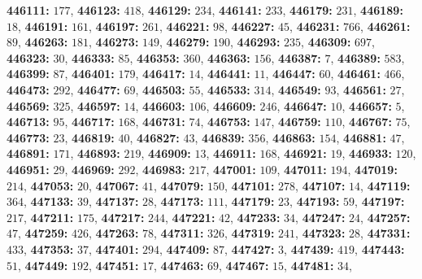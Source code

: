 \textsf{\bfseries 446111:} $177$, \textsf{\bfseries 446123:} $418$, \textsf{\bfseries 446129:} $234$, \textsf{\bfseries 446141:} $233$, \textsf{\bfseries 446179:} $231$, \textsf{\bfseries 446189:} $18$, \textsf{\bfseries 446191:} $161$, \textsf{\bfseries 446197:} $261$, \textsf{\bfseries 446221:} $98$, \textsf{\bfseries 446227:} $45$, \textsf{\bfseries 446231:} $766$, \textsf{\bfseries 446261:} $89$, \textsf{\bfseries 446263:} $181$, \textsf{\bfseries 446273:} $149$, \textsf{\bfseries 446279:} $190$, \textsf{\bfseries 446293:} $235$, \textsf{\bfseries 446309:} $697$, \textsf{\bfseries 446323:} $30$, \textsf{\bfseries 446333:} $85$, \textsf{\bfseries 446353:} $360$, \textsf{\bfseries 446363:} $156$, \textsf{\bfseries 446387:} $7$, \textsf{\bfseries 446389:} $583$, \textsf{\bfseries 446399:} $87$, \textsf{\bfseries 446401:} $179$, \textsf{\bfseries 446417:} $14$, \textsf{\bfseries 446441:} $11$, \textsf{\bfseries 446447:} $60$, \textsf{\bfseries 446461:} $466$, \textsf{\bfseries 446473:} $292$, \textsf{\bfseries 446477:} $69$, \textsf{\bfseries 446503:} $55$, \textsf{\bfseries 446533:} $314$, \textsf{\bfseries 446549:} $93$, \textsf{\bfseries 446561:} $27$, \textsf{\bfseries 446569:} $325$, \textsf{\bfseries 446597:} $14$, \textsf{\bfseries 446603:} $106$, \textsf{\bfseries 446609:} $246$, \textsf{\bfseries 446647:} $10$, \textsf{\bfseries 446657:} $5$, \textsf{\bfseries 446713:} $95$, \textsf{\bfseries 446717:} $168$, \textsf{\bfseries 446731:} $74$, \textsf{\bfseries 446753:} $147$, \textsf{\bfseries 446759:} $110$, \textsf{\bfseries 446767:} $75$, \textsf{\bfseries 446773:} $23$, \textsf{\bfseries 446819:} $40$, \textsf{\bfseries 446827:} $43$, \textsf{\bfseries 446839:} $356$, \textsf{\bfseries 446863:} $154$, \textsf{\bfseries 446881:} $47$, \textsf{\bfseries 446891:} $171$, \textsf{\bfseries 446893:} $219$, \textsf{\bfseries 446909:} $13$, \textsf{\bfseries 446911:} $168$, \textsf{\bfseries 446921:} $19$, \textsf{\bfseries 446933:} $120$, \textsf{\bfseries 446951:} $29$, \textsf{\bfseries 446969:} $292$, \textsf{\bfseries 446983:} $217$, \textsf{\bfseries 447001:} $109$, \textsf{\bfseries 447011:} $194$, \textsf{\bfseries 447019:} $214$, \textsf{\bfseries 447053:} $20$, \textsf{\bfseries 447067:} $41$, \textsf{\bfseries 447079:} $150$, \textsf{\bfseries 447101:} $278$, \textsf{\bfseries 447107:} $14$, \textsf{\bfseries 447119:} $364$, \textsf{\bfseries 447133:} $39$, \textsf{\bfseries 447137:} $28$, \textsf{\bfseries 447173:} $111$, \textsf{\bfseries 447179:} $23$, \textsf{\bfseries 447193:} $59$, \textsf{\bfseries 447197:} $217$, \textsf{\bfseries 447211:} $175$, \textsf{\bfseries 447217:} $244$, \textsf{\bfseries 447221:} $42$, \textsf{\bfseries 447233:} $34$, \textsf{\bfseries 447247:} $24$, \textsf{\bfseries 447257:} $47$, \textsf{\bfseries 447259:} $426$, \textsf{\bfseries 447263:} $78$, \textsf{\bfseries 447311:} $326$, \textsf{\bfseries 447319:} $241$, \textsf{\bfseries 447323:} $28$, \textsf{\bfseries 447331:} $433$, \textsf{\bfseries 447353:} $37$, \textsf{\bfseries 447401:} $294$, \textsf{\bfseries 447409:} $87$, \textsf{\bfseries 447427:} $3$, \textsf{\bfseries 447439:} $419$, \textsf{\bfseries 447443:} $51$, \textsf{\bfseries 447449:} $192$, \textsf{\bfseries 447451:} $17$, \textsf{\bfseries 447463:} $69$, \textsf{\bfseries 447467:} $15$, \textsf{\bfseries 447481:} $34$, 
